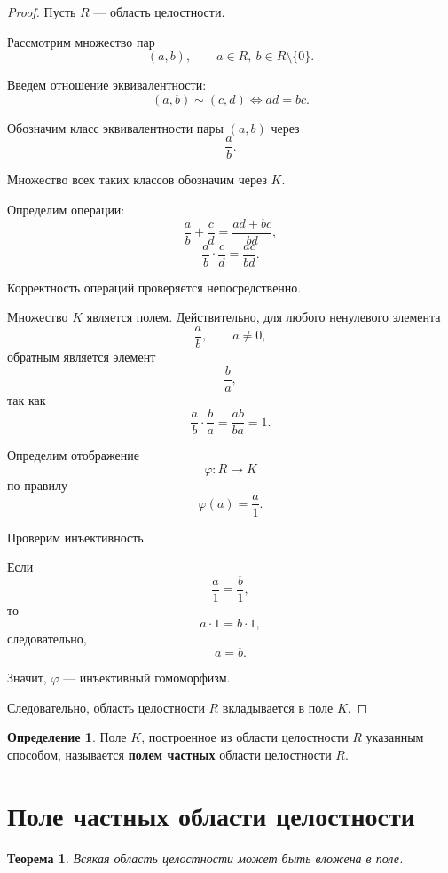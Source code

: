 \documentclass[12pt, a4paper]{article}
\newtheorem{theorem}{Теорема}
\theoremstyle{definition}
\newtheorem{definition}{Определение}
\theoremstyle{remark}
\begin{document}
\begin{proof}
	Пусть $R$ --- область целостности.
	
	Рассмотрим множество пар
	\[
	(a,b),
	\qquad
	a\in R,\ b\in R\setminus\{0\}.
	\]
	
	Введем отношение эквивалентности:
	\[
	(a,b)\sim(c,d)
	\iff
	ad=bc.
	\]
	
	Обозначим класс эквивалентности пары $(a,b)$ через
	\[
	\frac{a}{b}.
	\]
	
	Множество всех таких классов обозначим через $K$.
	
	Определим операции:
	\[
	\frac{a}{b}+\frac{c}{d}
	=
	\frac{ad+bc}{bd},
	\]
	\[
	\frac{a}{b}\cdot\frac{c}{d}
	=
	\frac{ac}{bd}.
	\]
	
	Корректность операций проверяется непосредственно.
	
	Множество $K$ является полем.
	Действительно, для любого ненулевого элемента
	\[
	\frac{a}{b},
	\qquad a\ne0,
	\]
	обратным является элемент
	\[
	\frac{b}{a},
	\]
	так как
	\[
	\frac{a}{b}\cdot\frac{b}{a}
	=
	\frac{ab}{ba}
	=
	1.
	\]
	
	Определим отображение
	\[
	\varphi:R\to K
	\]
	по правилу
	\[
	\varphi(a)=\frac{a}{1}.
	\]
	
	Проверим инъективность.
	
	Если
	\[
	\frac{a}{1}=\frac{b}{1},
	\]
	то
	\[
	a\cdot1=b\cdot1,
	\]
	следовательно,
	\[
	a=b.
	\]
	
	Значит, $\varphi$ --- инъективный гомоморфизм.
	
	Следовательно, область целостности $R$
	вкладывается в поле $K$.
\end{proof}

\begin{definition}
	Поле $K$, построенное из области целостности $R$ указанным способом,
	называется \textbf{полем частных} области целостности $R$.
\end{definition}
\section{Поле частных области целостности}

\begin{theorem}
	Всякая область целостности может быть вложена в поле.
\end{theorem}
\end{document}
